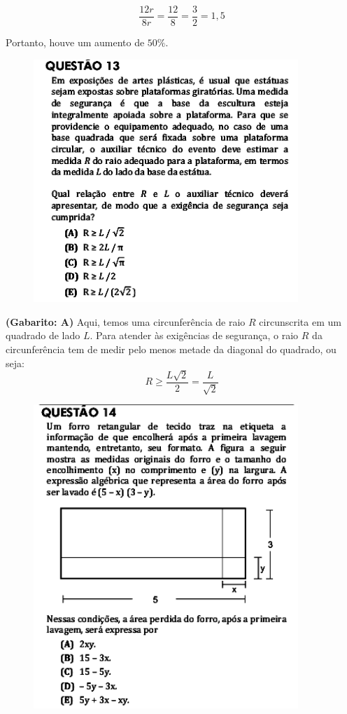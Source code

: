 \documentclass[a4paper]{article}
\begin{document}
\begin{equation*}
\frac{12r}{8r} = \frac{12}{8} = \frac{3}{2} = 1,5
\end{equation*}
\par\vspace{0.3cm} Portanto, houve um aumento de $50\%$.
\begin{figure}[H]
	\begin{center}
		\includegraphics[width=10cm]{L5Q13.png}
	\end{center}
\end{figure}
\par\textbf{(Gabarito: A)} Aqui, temos uma circunferência de raio $R$ circunscrita em um quadrado de lado $L$. Para atender às exigências de segurança, o raio $R$ da circunferência tem de medir pelo menos metade da diagonal do quadrado, ou seja:
\begin{equation*}
R\geq \frac{L\sqrt{2}}{2} = \frac{L}{\sqrt{2}}
\end{equation*}
\begin{figure}[H]
	\begin{center}
		\includegraphics[width=10cm]{L5Q14.png}
	\end{center}
\end{figure}
\end{document}
